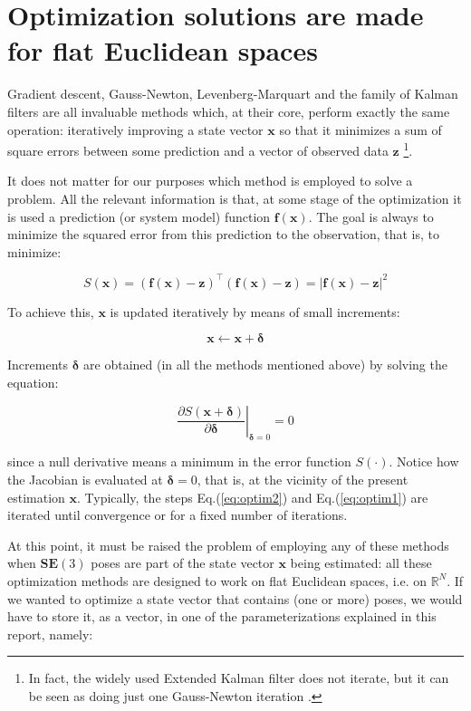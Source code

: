 \documentclass[a4paper,11pt]{report}
\newcommand{\DEL}{{\bm{\delta}}}
\begin{document}
\section{Optimization solutions are made for flat Euclidean spaces}

Gradient descent, Gauss-Newton, Levenberg-Marquart and the family of Kalman
filters are all
invaluable methods which, at their core, perform exactly the same operation:
iteratively improving a state vector $\mathbf{x}$ so that it minimizes
a sum of square errors between some prediction and a vector of observed data $\mathbf{z}$
\footnote{In fact, the widely used Extended Kalman filter does not iterate,
but it can be seen as doing just one Gauss-Newton iteration \cite{bell1993ikf}.}.

It does not matter for our purposes which method is employed to solve a problem.
All the relevant information is that, at some stage of the optimization
it is used a prediction (or system model) function
$\mathbf{f}(\mathbf{x})$.
The goal is always to minimize the squared error from
this prediction to the observation, that is,
to minimize:

\begin{equation}
S(\mathbf{x}) = (\mathbf{f}(\mathbf{x})-\mathbf{z})^\top (\mathbf{f}(\mathbf{x})-\mathbf{z})
 = | \mathbf{f}(\mathbf{x})-\mathbf{z} |^2
\end{equation}

To achieve this, $\mathbf{x}$ is updated iteratively by means of small increments:

\begin{equation}
\label{eq:optim1}
 \mathbf{x}  \leftarrow \mathbf{x} + \DEL
\end{equation}

Increments $\DEL$ are obtained
(in all the methods mentioned above)
by solving the equation:

\begin{equation}
\label{eq:optim2}
\left. \frac{\partial S(\mathbf{x} + \DEL )}{\partial \DEL }
\right|_{\DEL=0}
= 0
\end{equation}

\noindent since a null derivative means a minimum in the error function $S(\cdot)$.
Notice how the Jacobian is evaluated at $\DEL=0$, that is, at the vicinity of
the present estimation $\mathbf{x}$.
Typically, the steps Eq.(\ref{eq:optim2}) and Eq.(\ref{eq:optim1}) are
iterated until convergence or for a fixed number of iterations.

At this point, it must be raised the problem of employing any of
these methods when $\mathbf{SE}(3)$ poses
are part of the state vector $\mathbf{x}$ being estimated:
all these optimization methods are designed to work on flat Euclidean spaces, i.e. on $\mathbb{R}^N$.
If we wanted to optimize a state vector that contains (one or more) poses,
we would have to store it, as a vector, in one of the parameterizations explained in this report, namely:
\end{document}
